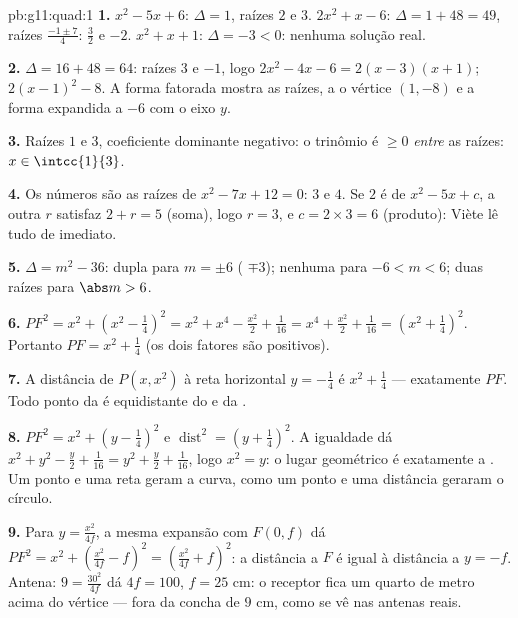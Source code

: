 \begin{solution}{pb:g11:quad:1}
\textbf{1.} $x^2 - 5x + 6$: $\Delta = 1$, raízes $2$ e $3$.
$2x^2 + x - 6$: $\Delta = 1 + 48 = 49$, raízes
$\frac{-1 \pm 7}{4}$: $\frac32$ e $-2$. $x^2 + x + 1$:
$\Delta = -3 < 0$: nenhuma solução real.

\textbf{2.} $\Delta = 16 + 48 = 64$: raízes $3$ e $-1$, logo
$2x^2 - 4x - 6 = 2(x - 3)(x + 1)$; 
$2(x - 1)^2 - 8$. A forma fatorada mostra as raízes, a  o vértice $(1, -8)$ e a forma expandida a 
$-6$ com o eixo $y$.

\textbf{3.} Raízes $1$ e $3$, coeficiente dominante negativo: o
trinômio é $\geq 0$ \emph{entre} as raízes:
$x \in \intcc{1}{3}$.

\textbf{4.} Os números são as raízes de $x^2 - 7x + 12 = 0$:
$3$ e $4$. Se $2$ é  de $x^2 - 5x + c$, a outra  $r$
satisfaz $2 + r = 5$ (soma), logo $r = 3$, e
$c = 2 \times 3 = 6$ (produto): Viète lê tudo de imediato.

\textbf{5.} $\Delta = m^2 - 36$:  dupla para $m = \pm 6$
( $\mp 3$); nenhuma  para $-6 < m < 6$; duas raízes
para $\abs m > 6$.

\textbf{6.} $PF^2 = x^2 + \left(x^2 - \frac14\right)^2
= x^2 + x^4 - \frac{x^2}{2} + \frac{1}{16}
= x^4 + \frac{x^2}{2} + \frac{1}{16}
= \left(x^2 + \frac14\right)^2$. Portanto
$PF = x^2 + \frac14$ (os dois fatores são positivos).

\textbf{7.} A distância de $P(x, x^2)$ à reta horizontal
$y = -\frac14$ é $x^2 + \frac14$ --- exatamente $PF$. Todo
ponto da  é equidistante do  e da .

\textbf{8.} $PF^2 = x^2 + \left(y - \frac14\right)^2$ e
$\operatorname{dist}^2 = \left(y + \frac14\right)^2$. A
igualdade dá $x^2 + y^2 - \frac y2 + \frac{1}{16} = y^2 +
\frac y2 + \frac1{16}$, logo $x^2 = y$: o lugar geométrico é
exatamente a . Um ponto e uma reta geram a curva, como
um ponto e uma distância geraram o círculo.

\textbf{9.} Para $y = \frac{x^2}{4f}$, a mesma expansão com
$F(0, f)$ dá $PF^2 = x^2 + \left(\frac{x^2}{4f} - f\right)^2
= \left(\frac{x^2}{4f} + f\right)^2$: a distância a $F$ é igual
à distância a $y = -f$. Antena: $9 = \frac{30^2}{4f}$ dá
$4f = 100$, $f = 25$ cm: o receptor fica um quarto de metro
acima do vértice --- fora da concha de $9$ cm, como se vê nas
antenas reais.


\end{solution}
